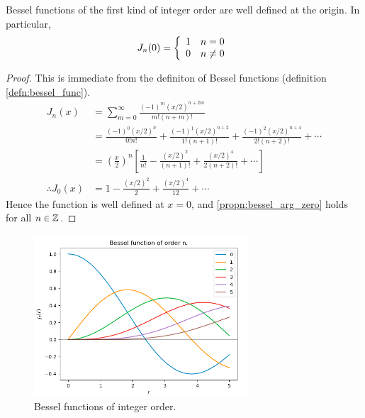 \begin{propn}\label{propn:bessel_at_origin}
  Bessel functions of the first kind of integer order are well defined at the origin. In particular,
  \begin{align}\label{propn:bessel_arg_zero}
      J_n(0) =\left\{
        \begin{array}{c l}
             1 & n = 0 \\
             0 & n \neq 0
        \end{array}\right.
  \end{align}
\end{propn}
\begin{proof}
  This is immediate from the definiton of Bessel functions (definition \ref{defn:bessel_func}).
    \begin{align*}
      J_n(x)
        &= \sum^\infty_{m=0} \frac{(-1)^m(x/2)^{n+2m}}{m! (n+m)!}\\
        &= \frac{(-1)^0(x/2)^{n}}{0!n!}         %
          + \frac{(-1)^1(x/2)^{n+2}}{1!(n+1)!}  %
          + \frac{(-1)^2(x/2)^{n+4}}{2!(n+2)!}  %
          + \dotsb \\
        &= \left(\frac{x}{2}\right)^n
          \left[\frac{1}{n!}           %
          - \frac{(x/2)^{2}}{(n+1)!}   %
          + \frac{(x/2)^{4}}{2(n+2)!}  %
          + \dotsb \right]\\
      \therefore
      J_0(x)
        &= 1
          - \frac{(x/2)^{2}}{2}
          + \frac{(x/2)^{4}}{12} + \dotsb
    \end{align*}
  Hence the function is well defined at $x=0$, and \ref{propn:bessel_arg_zero} holds for all $n \in \mathbb{Z}$.
\end{proof}\par

\begin{figure} \centering
  \includegraphics[width=8cm]{../figures/plot_bessel_int_order}
  \caption{Bessel functions of integer order.}\label{fig:bessel_int_problem}
\end{figure}

